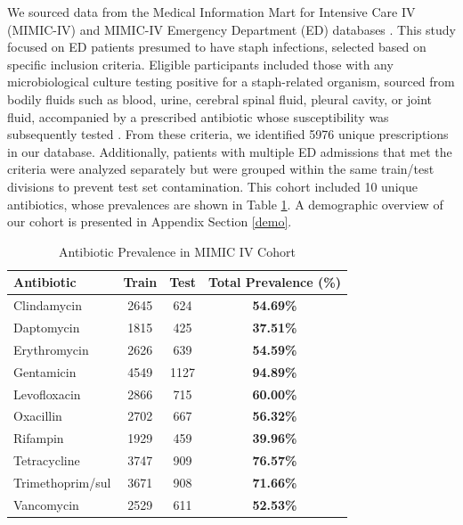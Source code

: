 \documentclass{article}
\theoremstyle{plain}
\theoremstyle{definition}
\theoremstyle{remark}
\begin{document}
We sourced data from the Medical Information Mart for Intensive Care IV (MIMIC-IV) and MIMIC-IV Emergency Department (ED) databases \cite{johnson2020mimic, johnson2023mimic}. This study focused on ED patients presumed to have staph infections, selected based on specific inclusion criteria. Eligible participants included those with any microbiological culture testing positive for a staph-related organism, sourced from bodily fluids such as blood, urine, cerebral spinal fluid, pleural cavity, or joint fluid, accompanied by a prescribed antibiotic whose susceptibility was subsequently tested \cite{tong2015staphylococcus, kwiecinski2020staphylococcus}. From these criteria, we identified 5976 unique prescriptions in our database. Additionally, patients with multiple ED admissions that met the criteria were analyzed separately but were grouped within the same train/test divisions to prevent test set contamination. This cohort included 10 unique antibiotics, whose prevalences are shown in Table \ref{antibiotic-prevalence-table}. A demographic overview of our cohort is presented in Appendix Section \ref{demo}.

\begin{table}[h!]
\caption{Antibiotic Prevalence in MIMIC IV Cohort}
\label{antibiotic-prevalence-table}
\vskip 0.15in
\begin{center}
\begin{small}
\begin{sc}
\begin{adjustbox}{width=\columnwidth}
\begin{tabular}{lccc}
\toprule
Antibiotic & Train & Test & Total Prevalence (\%) \\
\midrule
Clindamycin & 2645 & 624 & \textbf{54.69\%} \\
Daptomycin & 1815 & 425 & \textbf{37.51\%} \\
Erythromycin & 2626 & 639 & \textbf{54.59\%} \\
Gentamicin & 4549 & 1127 & \textbf{94.89\%} \\
Levofloxacin & 2866 & 715 & \textbf{60.00\%} \\
Oxacillin & 2702 & 667 & \textbf{56.32\%} \\
Rifampin & 1929 & 459 & \textbf{39.96\%} \\
Tetracycline & 3747 & 909 & \textbf{76.57\%} \\
Trimethoprim/sul & 3671 & 908 & \textbf{71.66\%} \\
Vancomycin & 2529 & 611 & \textbf{52.53\%} \\
\bottomrule
\end{tabular}
\end{adjustbox}
\end{sc}
\end{small}
\end{center}
\vskip -0.1in
\end{table}
\end{document}
